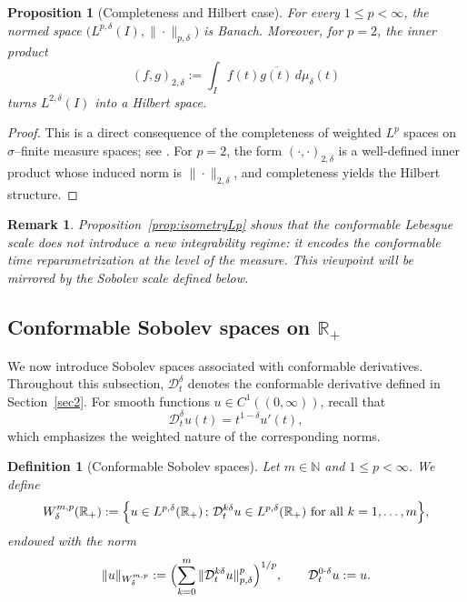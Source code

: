 \documentclass[preprint,12pt]{elsarticle}
\newtheorem{definition}{Definition}
\newtheorem{proposition}{Proposition}
\newtheorem{remark}{Remark}
\newtheorem{proof}{Proof}
\newcommand{\R}{\mathbb {R}}
\newcommand{\N}{\mathbb {N}}
\begin{document}
\begin{proposition}[Completeness and Hilbert case]\label{prop:BanachHilbertLp}
For every $1\le p<\infty$, the normed space $\bigl(L^{p,\delta}(I),\|\cdot\|_{p,\delta}\bigr)$
is Banach.
Moreover, for $p=2$, the inner product
\[
(f,g)_{2,\delta}:=\int_I f(t)\overline{g(t)}\,d\mu_\delta(t)
\]
turns $L^{2,\delta}(I)$ into a Hilbert space.
\end{proposition}

\begin{proof}
This is a direct consequence of the completeness of weighted $L^p$ spaces on
$\sigma$--finite measure spaces; see \cite{KufnerWeighted}.
For $p=2$, the form $(\cdot,\cdot)_{2,\delta}$ is a well-defined inner product
whose induced norm is $\|\cdot\|_{2,\delta}$, and completeness yields the Hilbert
structure.
\end{proof}

\begin{remark}\label{rem:measure_encodes_clock}
Proposition~\ref{prop:isometryLp} shows that the conformable Lebesgue scale does
not introduce a new integrability regime: it encodes the conformable time
reparametrization at the level of the measure.
This viewpoint will be mirrored by the Sobolev scale defined below.
\end{remark}

\subsection{Conformable Sobolev spaces on $\R_+$}

We now introduce Sobolev spaces associated with conformable derivatives.
Throughout this subsection, $\mathcal D_t^\delta$ denotes the conformable
derivative defined in Section~\ref{sec2}.
For smooth functions $u\in C^1((0,\infty))$, recall that
\[
\mathcal D_t^\delta u(t)=t^{1-\delta}u'(t),
\]
which emphasizes the weighted nature of the corresponding norms.

\begin{definition}[Conformable Sobolev spaces]\label{def:Wmpdelta}
Let $m\in\N$ and $1\le p<\infty$.
We define
\[
W^{m,p}_\delta(\R_+)
:=
\Bigl\{
u\in L^{p,\delta}(\R_+)\,;\,
\mathcal D_t^{k\delta}u\in L^{p,\delta}(\R_+)
\ \text{for all }k=1,\dots,m
\Bigr\},
\]
endowed with the norm
\[
\|u\|_{W^{m,p}_\delta}
:=
\Bigl(\sum_{k=0}^m \|\mathcal D_t^{k\delta}u\|_{p,\delta}^p\Bigr)^{1/p},
\qquad
\mathcal D_t^{0\cdot\delta}u:=u.
\]
\end{definition}
\end{document}
